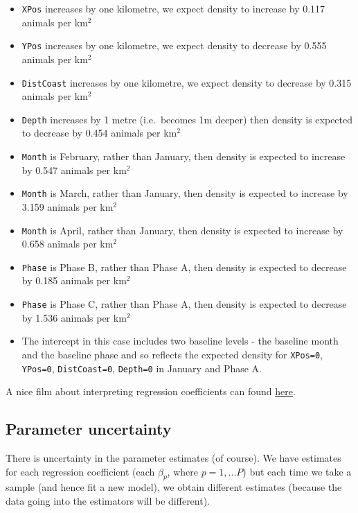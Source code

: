 \documentclass[
  oneside]{krantz}
\begin{document}
\begin{itemize}
\item
  \texttt{XPos} increases by one kilometre, we expect density to increase by 0.117 animals per km\(^2\)
\item
  \texttt{YPos} increases by one kilometre, we expect density to decrease by 0.555 animals per km\(^2\)
\item
  \texttt{DistCoast} increases by one kilometre, we expect density to decrease by 0.315 animals per km\(^2\)
\item
  \texttt{Depth} increases by 1 metre (i.e.~becomes 1m deeper) then density is expected to decrease by 0.454 animals per km\(^2\)
\item
  \texttt{Month} is February, rather than January, then density is expected to increase
  by 0.547 animals per km\(^2\)
\item
  \texttt{Month} is March, rather than January, then density is expected to increase by 3.159 animals per km\(^2\)
\item
  \texttt{Month} is April, rather than January, then density is expected to increase by 0.658 animals per km\(^2\)
\item
  \texttt{Phase} is Phase B, rather than Phase A, then density is expected to decrease by 0.185 animals per km\(^2\)
\item
  \texttt{Phase} is Phase C, rather than Phase A, then density is expected to decrease by 1.536 animals per km\(^2\)
\item
  The intercept in this case includes two baseline levels - the baseline month and the baseline phase and so reflects the expected density for \texttt{XPos=0}, \texttt{YPos=0}, \texttt{DistCoast=0}, \texttt{Depth=0} in January and Phase A.
\end{itemize}

A nice film about interpreting regression coefficients can found \href{http://www.youtube.com/watch?v=JwGaos2Y9bM}{here}.

\hypertarget{parameter-uncertainty}{%
\subsection{Parameter uncertainty}\label{parameter-uncertainty}}

There is uncertainty in the parameter estimates (of course). We have estimates for each regression coefficient (each \(\beta_p\), where \(p=1,...P\)) but each time we take a sample (and hence fit a new model), we obtain different estimates (because the data going into the estimators will be different).
\end{document}
